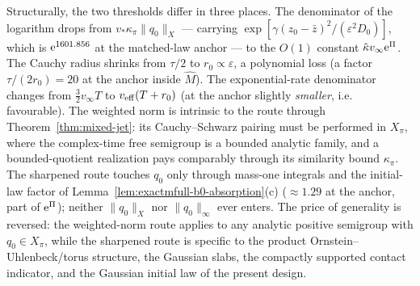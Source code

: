 \begin{remark}
Structurally, the two thresholds differ in three places.  The denominator
of the logarithm drops from \(v_*\kappa_\pi\|q_0\|_X\) --- carrying
\(\exp[\gamma(z_0-\bar z)^2/(\varepsilon^2D_0)]\), which is
\(\mathrm e^{1601.856}\) at the matched-law anchor --- to the \(O(1)\) constant
\(\hat\kappa v_\infty\mathrm e^{\Pi}\).  The Cauchy radius shrinks from
\(\tau/2\) to \(r_0\propto\varepsilon\), a polynomial loss (a factor
\(\tau/(2r_0)=20\) at the anchor inside \(\hat M\)).  The exponential-rate
denominator changes from \(\tfrac32v_\infty T\) to
\(v_{\rm eff}(T+r_0)\) (at the anchor slightly \emph{smaller}, i.e.
favourable).  The weighted norm is intrinsic to the route through
Theorem~\ref{thm:mixed-jet}: its Cauchy--Schwarz pairing must be performed
in \(X_\pi\), where the complex-time free semigroup is a bounded analytic
family, and a bounded-quotient realization pays comparably through its
similarity bound \(\kappa_\pi\).  The sharpened route touches \(q_0\) only
through mass-one integrals and the initial-law factor of
Lemma~\ref{lem:exactmfull-b0-absorption}(c) (\(\approx1.29\) at the
anchor, part of \(\mathrm e^{\Pi}\)); neither \(\|q_0\|_X\) nor
\(\|q_0\|_\infty\) ever enters.  The price of generality is reversed: the
weighted-norm route applies to any analytic positive semigroup with
\(q_0\in X_\pi\), while the sharpened route is specific to the product
Ornstein--Uhlenbeck/torus structure, the Gaussian slabs, the compactly
supported contact indicator, and the Gaussian initial law of the present
design.
\end{remark}

